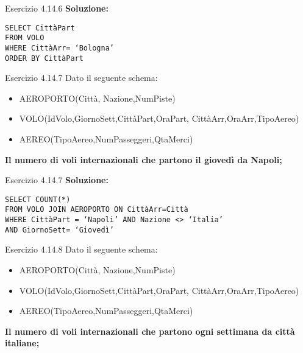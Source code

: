 \begin{frame}{Esercizio 4.14.6}
    \textbf{Soluzione:}
    \vspace{1em}
    
    \texttt{SELECT Citt\`aPart\\FROM VOLO\\WHERE Citt\`aArr= `Bologna'\\ORDER BY Citt\`aPart}
\end{frame}
\begin{frame}{Esercizio 4.14.7}
    Dato il seguente schema:
    \begin{itemize}
        \item AEROPORTO(Citt\`a, Nazione,NumPiste)
        \item VOLO(IdVolo,GiornoSett,Citt\`aPart,OraPart,
        Citt\`aArr,OraArr,TipoAereo)
        \item AEREO(TipoAereo,NumPasseggeri,QtaMerci)
    \end{itemize}
    \vspace{1em}
    
    \textbf{Il numero di voli internazionali che partono il gioved\`i da Napoli;}
\end{frame}

\begin{frame}{Esercizio 4.14.7}
    \textbf{Soluzione:}
    \vspace{1em}
    
    \texttt{SELECT COUNT(*)\\FROM VOLO JOIN AEROPORTO ON Citt\`aArr=Citt\`a\\WHERE Citt\`aPart = `Napoli' AND Nazione <> `Italia' \\AND GiornoSett= `Gioved\`i'}
\end{frame}
\begin{frame}{Esercizio 4.14.8}
    Dato il seguente schema:
    \begin{itemize}
        \item AEROPORTO(Citt\`a, Nazione,NumPiste)
        \item VOLO(IdVolo,GiornoSett,Citt\`aPart,OraPart,
        Citt\`aArr,OraArr,TipoAereo)
        \item AEREO(TipoAereo,NumPasseggeri,QtaMerci)
    \end{itemize}
    \vspace{1em}
    
    \textbf{Il numero di voli internazionali che partono ogni settimana da citt\`a italiane;}
\end{frame}

